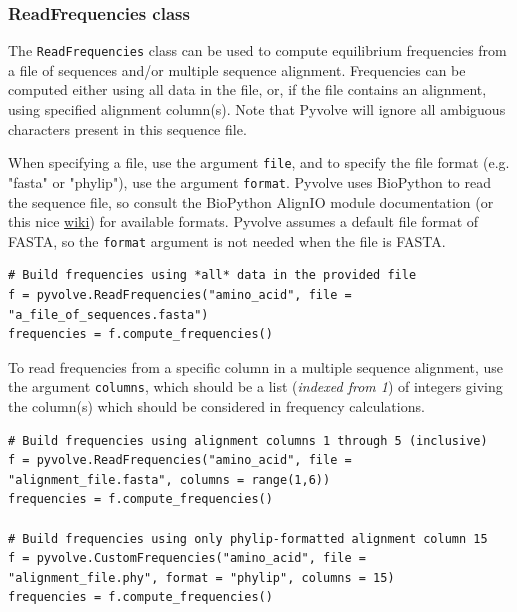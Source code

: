 \documentclass{article}
\newcommand{\code}[1]{\texttt{\small{#1}}}
\begin{document}
\subsubsection{ReadFrequencies class}
The \code{ReadFrequencies} class can be used to compute equilibrium frequencies from a file of sequences and/or multiple sequence alignment. Frequencies can be computed either using all data in the file, or, if the file contains an alignment, using specified alignment column(s).
Note that Pyvolve will ignore all ambiguous characters present in this sequence file.

When specifying a file, use the argument \code{file}, and to specify the file format (e.g. "fasta" or "phylip"), use the argument \code{format}. Pyvolve uses BioPython to read the sequence file, so consult the BioPython AlignIO module documentation (or this nice \href{http://biopython.org/wiki/AlignIO}{wiki}) for available formats. Pyvolve assumes a default file format of FASTA, so the \code{format} argument is not needed when the file is FASTA.

\begin{lstlisting}
# Build frequencies using *all* data in the provided file
f = pyvolve.ReadFrequencies("amino_acid", file = "a_file_of_sequences.fasta")
frequencies = f.compute_frequencies()
\end{lstlisting}

To read frequencies from a specific column in a multiple sequence alignment, use the argument \code{columns}, which should be a list (\emph{indexed from 1}) of integers giving the column(s) which should be considered in frequency calculations.
\begin{lstlisting}
# Build frequencies using alignment columns 1 through 5 (inclusive)
f = pyvolve.ReadFrequencies("amino_acid", file = "alignment_file.fasta", columns = range(1,6))
frequencies = f.compute_frequencies()

# Build frequencies using only phylip-formatted alignment column 15
f = pyvolve.CustomFrequencies("amino_acid", file = "alignment_file.phy", format = "phylip", columns = 15)
frequencies = f.compute_frequencies()

\end{lstlisting}
\end{document}
